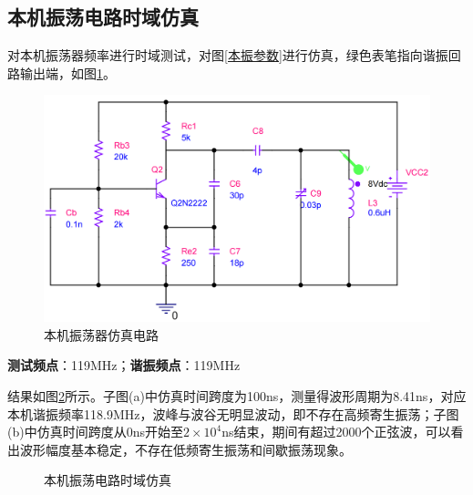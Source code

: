 \documentclass[a4paper,12pt,twoside]{article}
\begin{document}
\subsection{本机振荡电路时域仿真}
对本机振荡器频率进行时域测试，对图\ref{本振参数}进行仿真，绿色表笔指向谐振回路输出端，如图\ref{本振仿真电路}。
\begin{figure}[H]
    \centering
    \includegraphics[scale=0.16]{本振仿真电路.png}
    \caption{本机振荡器仿真电路}
    \label{本振仿真电路}
\end{figure}

\textbf{测试频点}：119MHz；\textbf{谐振频点}：119MHz

结果如图\ref{本振_wave}所示。子图(a)中仿真时间跨度为100ns，测量得波形周期为8.41ns，对应本机谐振频率118.9MHz，波峰与波谷无明显波动，即不存在高频寄生振荡；子图(b)中仿真时间跨度从0ns开始至$2\times 10^4$ns结束，期间有超过2000个正弦波，可以看出波形幅度基本稳定，不存在低频寄生振荡和间歇振荡现象。
\begin{figure}[H]
    \centering
     \hspace{0.01\linewidth}
    \caption{本机振荡电路时域仿真}
  \label{本振_wave}
\end{figure}
\end{document}
